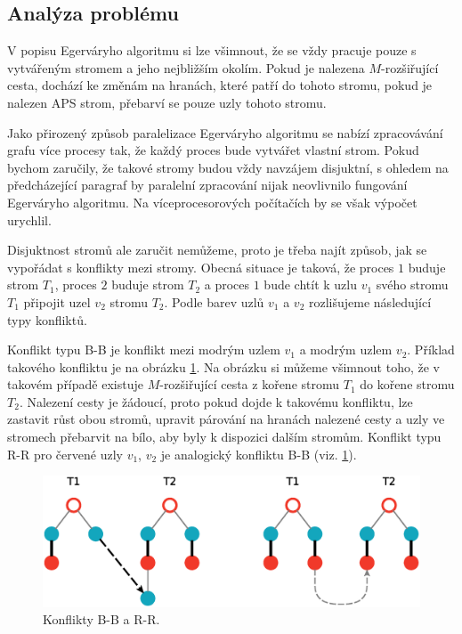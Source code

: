 \documentclass[a4paper, 11pt, titlepage, final]{article}[3. prosinec 2011]
\begin{document}
\subsection{Analýza problému}

V popisu Egerváryho algoritmu si lze všimnout, že se vždy pracuje pouze s vytvářeným stromem a jeho nejbližším okolím. Pokud je nalezena $M$-rozšiřující cesta, dochází ke změnám na hranách, které patří do tohoto stromu, pokud je nalezen APS strom, přebarví se pouze uzly tohoto stromu.

Jako přirozený způsob paralelizace Egerváryho algoritmu se nabízí zpracovávání grafu více procesy tak, že každý proces bude vytvářet vlastní strom. Pokud bychom zaručily, že takové stromy budou vždy navzájem disjuktní, s ohledem na předcházející paragraf by paralelní zpracování nijak neovlivnilo fungování Egerváryho algoritmu. Na víceprocesorových počítačích by se však výpočet urychlil.

Disjuktnost stromů ale zaručit nemůžeme, proto je třeba najít způsob, jak se vypořádat s konflikty mezi stromy. Obecná situace je taková, že proces $1$ buduje strom $T_1$, proces $2$ buduje strom $T_2$ a proces $1$ bude chtít k uzlu $v_1$ svého stromu $T_1$ připojit uzel $v_2$ stromu $T_2$. Podle barev uzlů $v_1$ a $v_2$ rozlišujeme následující typy konfliktů.

Konflikt typu B-B je konflikt mezi modrým uzlem $v_1$ a modrým uzlem $v_2$. Příklad takového konfliktu je na obrázku \ref{imgXX}. Na obrázku si můžeme všimnout toho, že v takovém případě existuje $M$-rozšiřující cesta z kořene stromu $T_1$ do kořene stromu $T_2$. Nalezení cesty je žádoucí, proto pokud dojde k takovému konfliktu, lze zastavit růst obou stromů, upravit párování na hranách nalezené cesty a uzly ve stromech přebarvit na bílo, aby byly k dispozici dalším stromům. Konflikt typu R-R pro červené uzly $v_1$, $v_2$ je analogický konfliktu B-B (viz. \ref{imgXX}).

\begin{figure}[ht]
  \centering
  \includegraphics[scale=0.5]{img/XXconflicts.eps}
  \caption{Konflikty B-B a R-R.}
  \label{imgXX}
\end{figure}
\end{document}
